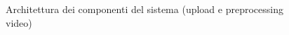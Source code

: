 \begin{figure}[htbp]
\centering
\vspace*{-1cm} %
\vspace*{-0.5cm} %
\caption{Architettura dei componenti del sistema (upload e preprocessing video)}
\label{fig:component_architecture1}
\end{figure}


